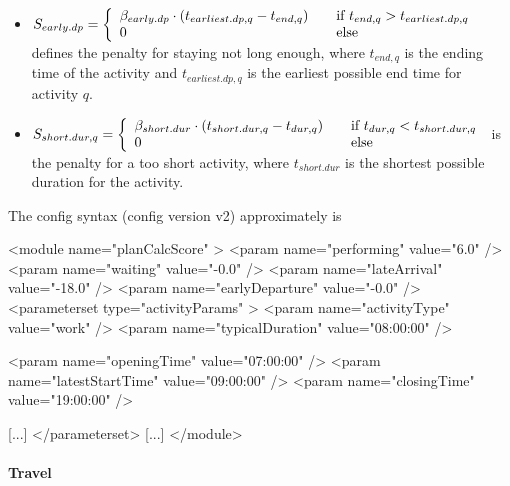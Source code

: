 \begin{itemize}
\medskip

\item $S_{early.dp} = \left\{
  \begin{array}{l l}
    \beta_{early.dp} \cdot (t_{earliest.dp, q} - t_{end,q}) & \quad \text{if $t_{end,q} > t_{earliest.dp,q}$}\\
    0 & \quad \text{else}
  \end{array} \right.$
%
defines the penalty for staying not long enough, where $t_{end,q}$ is the ending time of the activity and $t_{earliest.dp,q}$ is the earliest possible end time for activity $q$.

\medskip

\item $ S_{short.dur, q} = \left\{
  \begin{array}{l l}
    \beta_{short.dur} \cdot (t_{short.dur, q} - t_{dur,q}) & \quad \text{if $t_{dur,q} < t_{short.dur,q}$}\\
    0 & \quad \text{else}
  \end{array} \right.$
%  
  is the penalty for a too short activity, where $t_{short.dur}$ is the shortest possible duration for the activity.
\end{itemize}

The config syntax (config version v2) approximately is
\begin{xml}
<module name="planCalcScore" >
   <param name="performing" value="6.0" />
   <param name="waiting" value="-0.0" />
   <param name="lateArrival" value="-18.0" />
   <param name="earlyDeparture" value="-0.0" />
   <parameterset type="activityParams" >
		 <param name="activityType" value="work" />
		 <param name="typicalDuration" value="08:00:00" />

		 <param name="openingTime" value="07:00:00" />
		 <param name="latestStartTime" value="09:00:00" />
		 <param name="closingTime" value="19:00:00" />

      [...]   
   </parameterset>
   [...]   
</module>
\end{xml}


\paragraph{Travel} 

